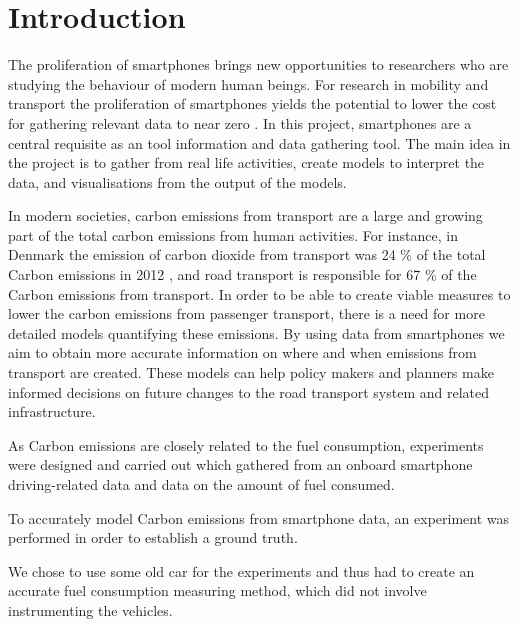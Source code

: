\section{Introduction}

The proliferation of smartphones brings new opportunities to researchers who are studying the behaviour of modern human beings. For research in mobility and transport the proliferation of smartphones yields the potential to lower the cost for gathering relevant data to near zero \cite{Liu2013}.
In this project, smartphones are a central requisite as an tool information and data gathering tool. The main idea in the project is to gather from real life activities, create models to interpret the data, and visualisations from the output of the models. 

In modern societies, carbon emissions from transport are a large and growing part of the total carbon emissions from human activities. For instance, in Denmark the emission of carbon dioxide from transport was 24 \% of the total Carbon emissions in 2012 \cite{nielsen2014}, and road transport is responsible for 67 \% of the Carbon emissions from transport. In order to be able to create viable measures to lower the carbon emissions from passenger transport, there is a need for more detailed models quantifying these emissions. By using data from smartphones we aim to obtain more accurate information on where and when emissions from transport are created. These models can help policy makers and planners make informed decisions on future changes to the road transport system and related infrastructure.

As Carbon emissions are closely related to the fuel consumption, experiments were designed and carried out which gathered from an onboard smartphone  driving-related data and data on the amount of fuel consumed.

To accurately model Carbon emissions from smartphone data, an experiment was performed in order to establish a ground truth. 

We chose to use some old car  for the experiments and thus 
 had to create an accurate fuel consumption measuring method, which did not involve instrumenting the vehicles. 


